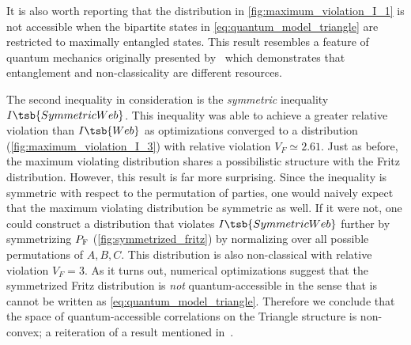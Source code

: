 \documentclass[aps, 10pt, english, twoside, pra, nofootinbib, tightenlines, longbibliography, superscriptaddress]{revtex4-1}
\begin{document}
    It is also worth reporting that the distribution in \cref{fig:maximum_violation_I_1} is not accessible when the bipartite states in \cref{eq:quantum_model_triangle} are restricted to maximally entangled states. This result resembles a feature of quantum mechanics originally presented by~\citet{Methot_2006} which demonstrates that entanglement and non-classicality are different resources.



    The second inequality in consideration is the \textit{symmetric} inequality $I\tsb{SymmetricWeb}$. This inequality was able to achieve a greater relative violation than $I\tsb{Web}$ as optimizations converged to a distribution (\cref{fig:maximum_violation_I_3}) with relative violation $V_F \simeq 2.61$. Just as before, the maximum violating distribution shares a possibilistic structure with the Fritz distribution. However, this result is far more surprising. Since the inequality is symmetric with respect to the permutation of parties, one would naively expect that the maximum violating distribution be symmetric as well. If it were not, one could construct a distribution that violates $I\tsb{SymmetricWeb}$ further by symmetrizing $\prob[\fritz]$ (\cref{fig:symmetrized_fritz}) by normalizing over all possible permutations of $A,B,C$. This distribution is also non-classical with relative violation $V_F = 3$. As it turns out, numerical optimizations suggest that the symmetrized Fritz distribution is \textit{not} quantum-accessible in the sense that is cannot be written as \cref{eq:quantum_model_triangle}. Therefore we conclude that the space of quantum-accessible correlations on the Triangle structure is non-convex; a reiteration of a result mentioned in~\citet{Inflation}.
\end{document}
